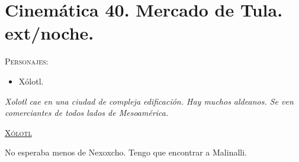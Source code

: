 \section{Cinemática 40. Mercado de Tula.  ext/noche. } \label{Cin:Cinematica40}
 \textsc{Personajes}:
 \begin{itemize}
 \item Xólotl.
 \end{itemize}
\textit{Xolotl cae en una ciudad de compleja edificación. Hay muchos aldeanos. Se ven comerciantes de todos lados de Mesoamérica.}
\begin{center}
\textsc{\underline{Xólotl}}
\\
\par
No esperaba menos de Nexoxcho. Tengo que encontrar a Malinalli.
\end{center}